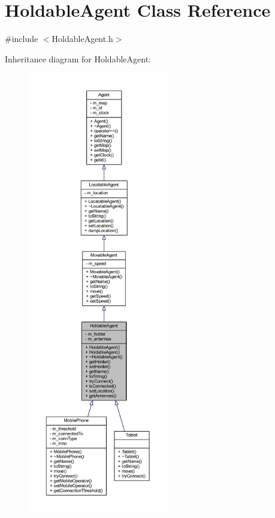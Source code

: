 \hypertarget{class_holdable_agent}{}\section{Holdable\+Agent Class Reference}
\label{class_holdable_agent}


{\ttfamily \#include $<$Holdable\+Agent.\+h$>$}



Inheritance diagram for Holdable\+Agent\+:\nopagebreak
\begin{figure}[H]
\begin{center}
\leavevmode
\includegraphics[height=550pt]{class_holdable_agent__inherit__graph}
\end{center}
\end{figure}


